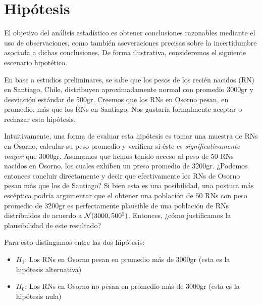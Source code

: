 \section{Hipótesis} 
\label{sec:hipótesis}

El objetivo del análisis estadístico es obtener conclusiones razonables mediante el uso de observaciones, como también aseveraciones precisas sobre la incertidumbre asociada a dichas conclusiones. De forma ilustrativa, consideremos el siguiente escenario hipotético.

En base a estudios preliminares, se sabe que los pesos de los recién nacidos (RN) en Santiago, Chile, distribuyen aproximadamente normal con promedio 3000gr y desviación estándar de 500gr. Creemos que los RNs en Osorno pesan, en promedio, más que los RNs en Santiago. Nos gustaría formalmente aceptar o rechazar esta hipótesis. 

Intuitivamente, una forma de evaluar esta hipótesis es tomar una muestra de RNs en Osorno, calcular su peso promedio y verificar si éste es \textit{significativamente mayor} que 3000gr. Asumamos que hemos tenido acceso al peso de 50 RNs nacidos en Osorno, los cuales exhiben un preso promedio de 3200gr. ¿Podemos entonces concluir directamente y decir que efectivamente los RNs de Osorno pesan más que los de Santiago?  Si bien esta es una posibilidad, una postura más escéptica podría argumentar que el obtener una población de 50 RNs con peso promedio de 3200gr es perfectamente plausible de una población de RNs distribuidos de acuerdo a ${\mathcal N}(3000,500^2)$. Entonces, ¿cómo justificamos la plausibilidad de este resultado?

Para esto distingamos entre las dos hipótesis: 

\begin{itemize}
	\item $H_1$: Los RNs en Osorno pesan en promedio más de 3000gr (esta es la hipótesis alternativa)
	\item $H_0$: Los RNs en Osorno no pesan en promedio más de 3000gr (esta es la hipótesis nula)
\end{itemize}

